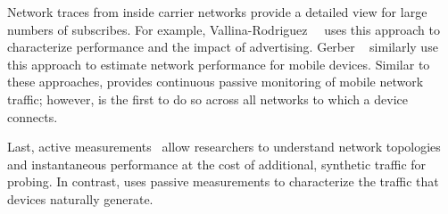 Network traces from inside carrier networks provide a detailed view for large numbers 
of subscribes. For example, Vallina-Rodriguez~\etal~\cite{vallina-rod:ads} uses this approach to characterize performance and 
the impact of advertising. Gerber \etal~\cite{gerber:passivespeed} similarly use this approach to 
estimate network performance for mobile devices.  \cite{maier:mobtraffic} \cite{chen:wifi}
Similar to these approaches, \platname provides continuous passive monitoring of mobile network 
traffic; however, \platname is the first to do so across all networks to which a device connects.

Last, active measurements~\cite{wang:middleboxes,sommers:cellwifi} allow researchers to understand network topologies and instantaneous 
performance at the cost of additional, synthetic traffic for probing. In contrast, \platname uses 
passive measurements to characterize the traffic that devices naturally generate.